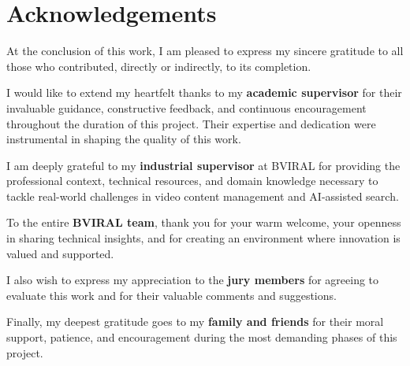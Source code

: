 \chapter*{Acknowledgements}

At the conclusion of this work, I am pleased to express my sincere gratitude to all those who
contributed, directly or indirectly, to its completion.

I would like to extend my heartfelt thanks to my \textbf{academic supervisor} for their
invaluable guidance, constructive feedback, and continuous encouragement throughout the duration
of this project. Their expertise and dedication were instrumental in shaping the quality of
this work.

I am deeply grateful to my \textbf{industrial supervisor} at BVIRAL for providing the
professional context, technical resources, and domain knowledge necessary to tackle real-world
challenges in video content management and AI-assisted search.

To the entire \textbf{BVIRAL team}, thank you for your warm welcome, your openness in sharing
technical insights, and for creating an environment where innovation is valued and supported.

I also wish to express my appreciation to the \textbf{jury members} for agreeing to evaluate
this work and for their valuable comments and suggestions.

Finally, my deepest gratitude goes to my \textbf{family and friends} for their moral support,
patience, and encouragement during the most demanding phases of this project.

